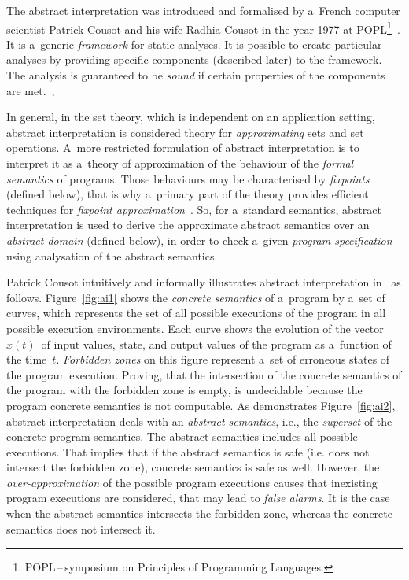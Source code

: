 The abstract interpretation was introduced and formalised by a~French
computer scientist Patrick Cousot and his wife Radhia Cousot in the year
1977 at POPL\footnote{POPL\,--\,symposium on Principles of Programming
Languages.}~\cite{AILatticeModelCousot}. It is a~generic \emph{framework}
for static analyses. It is possible to create particular analyses by
providing specific components (described later) to the framework. The
analysis is guaranteed to be \emph{sound} if certain properties of the
components are met.~\cite{favAI}, \cite{projectPracticeMarcin2018}

In general, in the set theory, which is independent on an application
setting, abstract interpretation is considered theory for
\emph{approximating} sets and set operations. A~more restricted formulation
of abstract interpretation is to interpret it as a~theory of approximation
of the behaviour of the \emph{formal semantics} of programs. Those
behaviours may be characterised by \emph{fixpoints} (defined below), that is
why a~primary part of the theory provides efficient techniques for
\emph{fixpoint approximation}~\cite{programAnalysisNielson}.
So, for a~standard semantics, abstract interpretation is used to derive
the approximate abstract semantics over an \emph{abstract domain} (defined
below), in order to check a~given \emph{program specification} using
analysation of the abstract semantics.~\cite{AIBasedFormalMethodsCousot}

Patrick Cousot intuitively and informally illustrates abstract
interpretation in~\cite{AIInNutshellCousot} as follows.
Figure~\ref{fig:ai1} shows the \emph{concrete semantics} of a~program
by a~set of curves, which represents the set of all possible executions
of the program in all possible execution environments. Each curve shows
the evolution of the vector~$ x(t) $~of input values, state, and
output values of the program as a~function of the time~$ t $.
\emph{Forbidden zones} on this figure represent a~set of erroneous states
of the program execution. Proving, that the intersection of the concrete
semantics of the program with the forbidden zone is empty, is undecidable
because the program concrete semantics is not computable. As demonstrates
Figure~\ref{fig:ai2}, abstract interpretation deals with an
\emph{abstract semantics}, i.e., the \emph{superset} of the concrete
program semantics. The abstract semantics includes all possible executions.
That implies that if the abstract semantics is safe (i.e. does not
intersect the forbidden zone), concrete semantics is safe as well. However,
the \emph{over-approximation} of the possible program executions causes
that inexisting program executions are considered, that may lead to
\emph{false alarms}. It is the case when the abstract semantics
intersects the forbidden zone, whereas the concrete semantics does not
intersect it.

